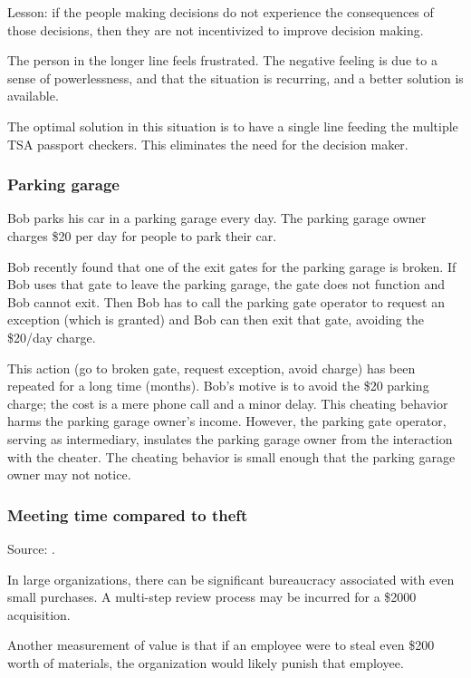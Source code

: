 Lesson: if the people making decisions do not experience the consequences of those decisions, then they are not incentivized to improve decision making.

The person in the longer line feels frustrated. The negative feeling is due to a sense of powerlessness, and that the situation is recurring, and a better solution is available.

The optimal solution in this situation is to have a single line feeding the multiple TSA passport checkers. This eliminates the need for the decision maker.


\subsubsection{Parking garage}
Bob parks his car in a parking garage every day. The parking garage owner charges \$20 per day for people to park their car.

Bob recently found that one of the exit gates for the parking garage is broken. If Bob uses that gate to leave the parking garage, the gate does not function and Bob cannot exit. Then Bob has to call the parking gate operator to request an exception (which is granted) and Bob can then exit that gate, avoiding the \$20/day charge.

This action (go to broken gate, request exception, avoid charge) has been repeated for a long time (months). Bob's motive is to avoid the \$20 parking charge; the cost is a mere phone call and a minor delay. This cheating behavior harms the parking garage owner's income. However, the parking gate operator, serving as intermediary, insulates the parking garage owner from the interaction with the cheater. The cheating behavior is small enough that the parking garage owner may not notice.


\subsubsection{Meeting time compared to theft}

Source: \cite{1995_Grove}.

In large organizations, there can be significant bureaucracy associated with even small purchases. A multi-step review process may be incurred for a \$2000 acquisition.

Another measurement of value is that if an employee were to steal even \$200 worth of materials, the organization would likely punish that employee.


